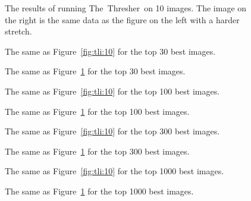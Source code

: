 \documentclass[12pt,preprint]{aastex}
\newcommand{\project}[1]{{\sffamily #1}}
\newcommand{\TheThresher}{\project{The~Thresher}}
\newcommand{\Fig}[1]{Figure~\ref{fig:#1}}
\newcommand{\fig}[1]{\Fig{#1}}
\newcommand{\figlabel}[1]{\label{fig:#1}}
\newcommand{\dfmplot}[1]{%
\begin{center}%
\end{center}%
}
\newcommand{\threshplot}[1]{%
\begin{center}%
\end{center}%
}
\begin{document}
\begin{figure}[!htbp]
    \threshplot{thresh10.png}
    \caption{The results of running \TheThresher\ on 10 images.
        The image on the right is the same data as the figure on the
        left with a harder stretch.\figlabel{thresh:10}}
\end{figure}

\begin{figure}[!htbp]
    \dfmplot{tli30.png}
    \caption{The same as \fig{tli:10} for the top 30 best images.
            \figlabel{tli:30}}
\end{figure}

\begin{figure}[!htbp]
    \threshplot{thresh30.png}
    \caption{The same as \fig{thresh:10} for the top 30 best images.
            \figlabel{thresh:30}}
\end{figure}

\begin{figure}[!htbp]
    \dfmplot{tli100.png}
    \caption{The same as \fig{tli:10} for the top 100 best images.
            \figlabel{tli:100}}
\end{figure}

\begin{figure}[!htbp]
    \threshplot{thresh100.png}
    \caption{The same as \fig{thresh:10} for the top 100 best images.
            \figlabel{thresh:100}}
\end{figure}

\begin{figure}[!htbp]
    \dfmplot{tli300.png}
    \caption{The same as \fig{tli:10} for the top 300 best images.
            \figlabel{tli:300}}
\end{figure}

\begin{figure}[!htbp]
    \threshplot{thresh300.png}
    \caption{The same as \fig{thresh:10} for the top 300 best images.
            \figlabel{thresh:300}}
\end{figure}

\begin{figure}[!htbp]
    \dfmplot{tli1000.png}
    \caption{The same as \fig{tli:10} for the top 1000 best images.
            \figlabel{tli:1000}}
\end{figure}

\begin{figure}[!htbp]
    \threshplot{thresh1000.png}
    \caption{The same as \fig{thresh:10} for the top 1000 best images.
            \figlabel{thresh:1000}}
\end{figure}
\end{document}

